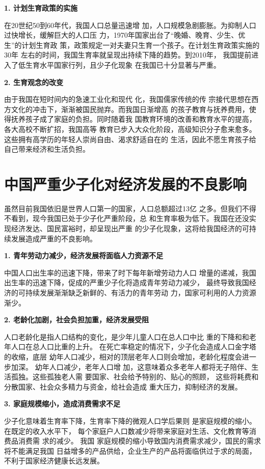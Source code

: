 \documentclass[cs5size,a4paper,nofonts]{ctexart}
\begin{document}
\begin{multicols}{2}
{\bf 1. 计划生育政策的实施}

在20世纪50到60年代，我国人口总量迅速增
加，人口规模急剧膨胀。为抑制人口过快增长，缓解巨大的人口压
力，1970年国家出台了“晚婚、晚育、少生、优生”的计划生育政
策，政策规定一对夫妻只生育一个孩子。在计划生育政策实施的30年
左右的时间，我国生育率就呈现出持续下降的趋势。到2010年，
我国提前进入了低生育水平国家行列，且少子化现象
在我国已十分显著与严重。

{\bf 2. 生育观念的改变}

由于我国在短时间内的急速工业化和现代
化，我国儒家传统的传
宗接代思想在西方文化的冲击下，渐渐被国民抛弃。而我国日渐增高
的孩子教育与抚养费用，使得抚养孩子成了家庭的负担。同时随着我
国教育环境的改善和教育水平的提高，各大高校不断扩招，我国高等
教育已步入大众化阶段，高级知识分子愈来愈多。
这些拥有高学历的年轻人崇尚自由、渴求舒适自在的
生活，因此不愿生育孩子给自己带来经济和生活负担。

\section{中国严重少子化对经济发展的不良影响}

虽然目前我国依旧是世界人口第一的国家，人口总额超过13亿
之多。但我们不得不看到，现今我国已处于少子化严重阶段，总
和生育率极为低下。我国在还没实现经济发达、国民富裕时，却呈现出严重
的少子化现象，这将给我国经济的可持续发展造成严重的不良影响。

{\bf 1. 青年劳动力减少，经济发展将面临人力资源不足}

中国人口出生率的迅速下降，带来了时下每年新增劳动力人口
增量的递减，我国
出生率的迅速下降，促成的严重少子化将造成青年劳动力减少，
最终导致我国经济的可持续发展渐渐缺乏新鲜的、有活力的青年劳动
力，国家可利用的人力资源渐少。

{\bf 2. 老龄化加剧，社会负担加重，经济发展受阻}

人口老龄化是指人口结构的变化，是少年儿童人口在总人口中比
重的下降和和老年人口在总人口比重的上升。
在死亡率稳定的情况下，少子化会造成人口金字塔的收缩，底层
幼年人口减少，相对的顶层老年人口则会增加，老龄化程度会进一
步加深。
幼年人口减少，老年人口增
加，这意味着众多老年人都将无子陪伴、生活孤独。这些孤独老人需
要国家、社会给予特别的、贴心的照顾，
这些将耗费和分散国家、社会众多精力与资金，给社会造成
重大压力，抑制经济的发展。

{\bf 3. 家庭规模缩小，造成消费需求不足}

少子化意味着生育率下降，生育率下降的微观人口学后果则
是家庭规模的缩小。
在既定的收入水平下，
每个家庭户人口数减少将带来家庭对生活、文化教育等消费品消费需
求的减少。
我国
家庭规模的缩小导致国内消费需求减少，国民的需求将不能满足我国
日益增多的产品供给，企业生产的产品将面临供过于求的局面，
不利于国家经济健康长远发展。


\end{multicols}
\end{document}
